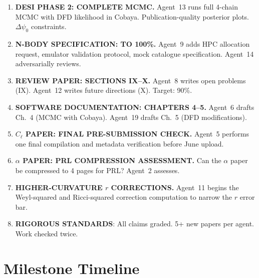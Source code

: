 \documentclass[11pt,a4paper]{article}
\begin{document}
\begin{enumerate}
\item \textbf{DESI PHASE 2: COMPLETE MCMC.} Agent~13 runs full 4-chain MCMC with DFD likelihood in Cobaya. Publication-quality posterior plots. $\Delta\psi_0$ constraints.

\item \textbf{N-BODY SPECIFICATION: TO 100\%.} Agent~9 adds HPC allocation request, emulator validation protocol, mock catalogue specification. Agent~14 adversarially reviews.

\item \textbf{REVIEW PAPER: SECTIONS IX--X.} Agent~8 writes open problems (IX). Agent~12 writes future directions (X). Target: 90\%.

\item \textbf{SOFTWARE DOCUMENTATION: CHAPTERS 4--5.} Agent~6 drafts Ch.~4 (MCMC with Cobaya). Agent~19 drafts Ch.~5 (DFD modifications).

\item \textbf{$C_\ell$ PAPER: FINAL PRE-SUBMISSION CHECK.} Agent~5 performs one final compilation and metadata verification before June upload.

\item \textbf{$\alpha$ PAPER: PRL COMPRESSION ASSESSMENT.} Can the $\alpha$ paper be compressed to 4 pages for PRL? Agent~2 assesses.

\item \textbf{HIGHER-CURVATURE $r$ CORRECTIONS.} Agent~11 begins the Weyl-squared and Ricci-squared correction computation to narrow the $r$ error bar.

\item \textbf{RIGOROUS STANDARDS}: All claims graded. 5+ new papers per agent. Work checked twice.
\end{enumerate}


\section{Milestone Timeline}
\label{sec:timeline}
\end{document}
